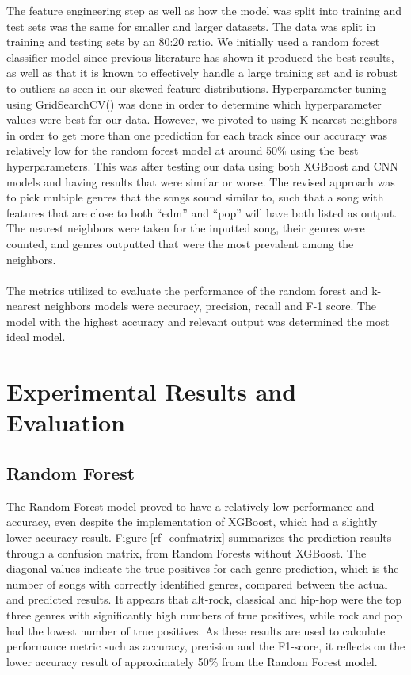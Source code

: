 \documentclass[times, twocolumn]{article}
\begin{document}
The feature engineering step as well as how the model was split into training and test sets was the same for smaller and larger datasets. The data was split in training and testing sets by an 80:20 ratio. We initially used a random forest classifier model since previous literature has shown it produced the best results, as well as that it is known to effectively handle a large training set and is robust to outliers as seen in our skewed feature distributions. Hyperparameter tuning using GridSearchCV() was done in order to determine which hyperparameter values were best for our data. However, we pivoted to using K-nearest neighbors in order to get more than one prediction for each track since our accuracy was relatively low for the random forest model at around 50\% using the best hyperparameters. This was after testing our data using both XGBoost and CNN models and having results that were similar or worse. The revised approach was to pick multiple genres that the songs sound similar to, such that a song with features that are close to both “edm” and “pop” will have both listed as output. The nearest neighbors were taken for the inputted song, their genres were counted, and genres outputted that were the most prevalent among the neighbors.\\\\
The metrics utilized to evaluate the performance of the random forest and k-nearest neighbors models were accuracy, precision, recall and F-1 score. The model with the highest accuracy and relevant output was determined the most ideal model.

\section{Experimental Results and Evaluation}
\subsection{Random Forest}
The Random Forest model proved to have a relatively low performance and accuracy, even despite the implementation of XGBoost, which had a slightly lower accuracy result. Figure \ref{rf_confmatrix} summarizes the prediction results through a confusion matrix, from Random Forests without XGBoost. The  diagonal values indicate the true positives for each genre prediction, which is the number of songs with correctly identified genres, compared between the actual and predicted results. It appears that alt-rock, classical and hip-hop were the top three genres with significantly high numbers of true positives, while rock and pop had the lowest number of true positives. As these results are used to calculate performance metric such as accuracy, precision and the F1-score, it reflects on the lower accuracy result of approximately 50\% from the Random Forest model.
\end{document}
